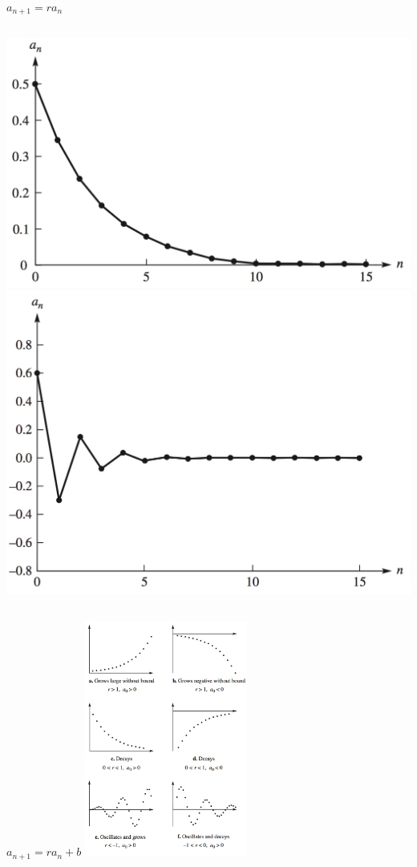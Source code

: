 \documentclass[
  ignorenonframetext,
]{ctexbeamer}
\begin{document}
\begin{frame}{\(a_{n+1}=ra_n\)}
\begin{columns}[T]
\begin{column}{0.4\textwidth}
\includegraphics{rf.png} \includegraphics{rnf.png}
\end{column}
\end{columns}
\end{frame}

\begin{frame}{\(a_{n+1}=ra_n + b\)}
\label{a_n1ra_n-b}
\includegraphics[width=0.4\textwidth,height=\textheight]{rb.png}
\end{frame}
\end{document}
